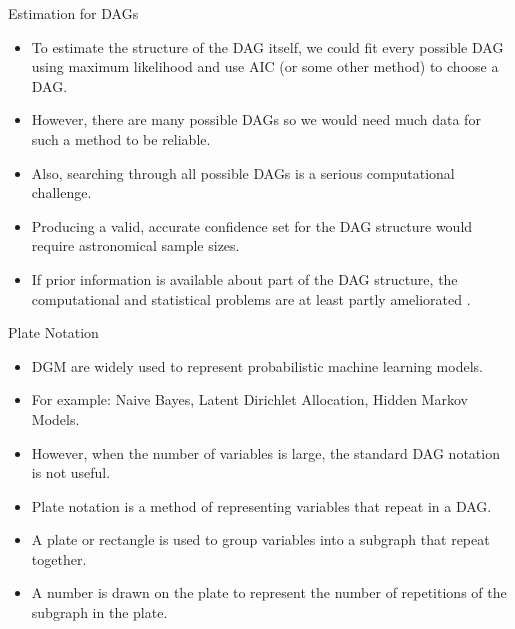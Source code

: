 \documentclass[handout]{beamer}
\begin{document}
\begin{frame}{Estimation for DAGs}
\scriptsize{
\begin{itemize}

\item To estimate the structure of the DAG itself, we could fit every possible DAG using maximum likelihood and use AIC (or some other method) to choose a DAG. 

\item However, there are many possible DAGs so we would need much data
for such a method to be reliable.

\item Also, searching through all possible DAGs is a serious computational challenge. 

\item Producing a valid, accurate confidence set for the DAG structure would require astronomical sample sizes. 

\item If prior information is available about part of the DAG structure, the computational and statistical problems are at least partly ameliorated \cite{wasserman2013all}.

 
\end{itemize}



} 

\end{frame}


\begin{frame}{Plate Notation}
\scriptsize{
\begin{itemize}
\item DGM are widely used to represent probabilistic machine learning models.

\item For example: Naive Bayes, Latent Dirichlet Allocation, Hidden Markov Models.

\item However, when the number of variables is large, the standard DAG notation is not useful.

\item Plate notation is a method of representing variables that repeat in a DAG.

\item A plate or rectangle is used to group variables into a subgraph that repeat together.

\item A number is drawn on the plate to represent the number of repetitions of the subgraph in the plate.
 
\end{itemize}



} 

\end{frame}
\end{document}
